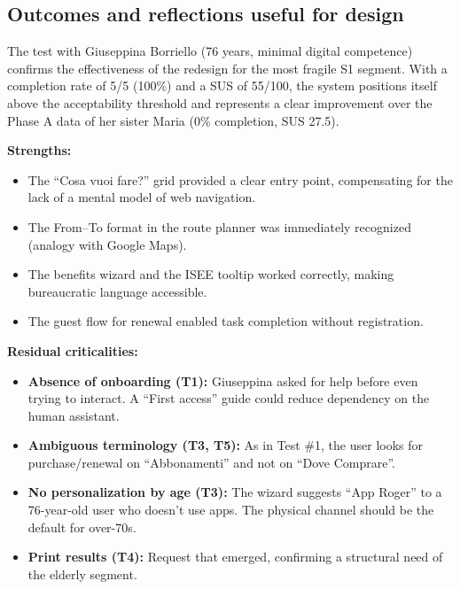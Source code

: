 ﻿\documentclass[11pt,a4paper]{article}
\begin{document}
\subsection*{Outcomes and reflections useful for design}
\begin{tcolorbox}[base]
The test with Giuseppina Borriello (76 years, minimal digital
competence) confirms the effectiveness of the redesign for the
most fragile S1 segment. With a completion rate of
5/5 (100\%) and a SUS of 55/100, the system positions itself
above the acceptability threshold and represents a
clear improvement over the Phase A data of her sister
Maria (0\% completion, SUS 27.5).

\medskip

\noindent\textbf{Strengths:}
\begin{itemize}[leftmargin=*]
  \item The ``Cosa vuoi fare?'' grid provided a clear
  entry point, compensating for the lack of a mental
  model of web navigation.
  \item The From--To format in the route planner was
  immediately recognized (analogy with Google Maps).
  \item The benefits wizard and the ISEE tooltip
  worked correctly, making bureaucratic
  language accessible.
  \item The guest flow for renewal enabled
  task completion without registration.
\end{itemize}

\medskip

\noindent\textbf{Residual criticalities:}
\begin{itemize}[leftmargin=*]
  \item \textbf{Absence of onboarding (T1):} Giuseppina
  asked for help before even trying to interact. A
  ``First access'' guide could reduce dependency
  on the human assistant.
  \item \textbf{Ambiguous terminology (T3, T5):} As in
  Test \#1, the user looks for purchase/renewal on
  ``Abbonamenti'' and not on ``Dove Comprare''.
  \item \textbf{No personalization by age (T3):}
  The wizard suggests ``App Roger'' to a 76-year-old user
  who doesn't use apps. The physical channel should be
  the default for over-70s.
  \item \textbf{Print results (T4):} Request that emerged, confirming a structural need of the
  elderly segment.
\end{itemize}

\end{tcolorbox}
\end{document}
